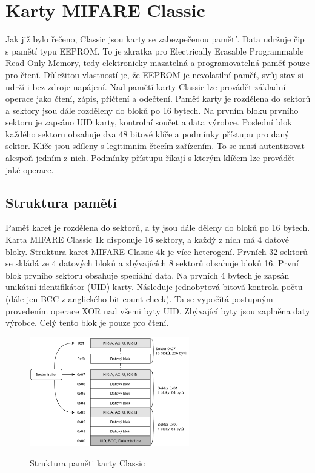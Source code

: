 \section{Karty MIFARE Classic}
Jak již bylo řečeno, Classic jsou karty se zabezpečenou pamětí. Data udržuje čip s pamětí typu EEPROM. To je zkratka pro Electrically Erasable Programmable {Read-Only} Memory, tedy elektronicky mazatelná a programovatelná paměť pouze pro čtení. Důležitou vlastností je, že EEPROM je nevolatilní paměť, svůj stav si udrží i bez zdroje napájení\cite{Smart_card_handbook}. Nad pamětí karty Classic lze provádět základní operace jako čtení, zápis, přičtení a odečtení. Paměť karty je rozdělena do sektorů a sektory jsou dále rozděleny do bloků po 16 bytech. Na prvním bloku prvního sektoru je zapsáno UID karty, kontrolní součet a data výrobce. Poslední blok každého sektoru obsahuje dva 48 bitové klíče a podmínky přístupu pro daný sektor. Klíče jsou sdíleny s legitimním čtecím zařízením. To se musí autentizovat alespoň jedním z nich. Podmínky přístupu říkají s kterým klíčem lze provádět jaké operace\cite{Dismantling_Mifare_Classic}\cite{Mifare_Classic_story}.
\par

\subsection{Struktura paměti} %
\label{sub:struktura_paměti}
Paměť karet je rozdělena do sektorů, a ty jsou dále děleny do bloků po 16 bytech. Karta MIFARE Classic 1k disponuje 16 sektory, a každý z nich má 4 datové bloky. Struktura karet MIFARE Classic 4k je více heterogení. Prvních 32 sektorů se skládá ze 4 datových bloků a zbývajících 8 sektorů obsahuje bloků 16. První blok prvního sektoru obsahuje speciální data. Na prvních 4 bytech je zapsán unikátní identifikátor (UID) karty. Následuje jednobytová bitová kontrola počtu (dále jen BCC z anglického bit count check). Ta se vypočítá postupným provedením operace XOR nad všemi byty UID. Zbývající byty jsou zaplněna daty výrobce. Celý tento blok je pouze pro čtení. 

\begin{figure}[h]\centering
  \centering
  \hspace*{-0.07\linewidth}
  \includegraphics[width=0.6\linewidth,height=180px]{obrazky-figures/MemoryStructure.png}\\[1pt]  
  \caption{Struktura paměti karty Classic\cite{PracticalAttackOnMIFARE}}    
  \label{obrazekStrukturaPametiKarty}
  
\end{figure}

